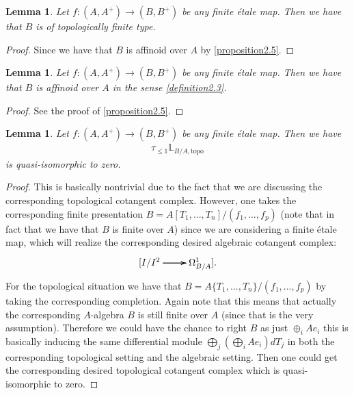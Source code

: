 \documentclass[12pt]{amsart}
\newtheorem{lemma}[theorem]{Lemma}
\theoremstyle{definition}
\numberwithin{equation}{section}
\begin{document}
\begin{lemma}
Let $f:(A,A^+)\rightarrow (B,B^+)$ be any finite \'etale map. Then we have that $B$ is of topologically finite type.
\end{lemma}

\begin{proof}
Since we have that $B$ is affinoid over $A$ by \cref{proposition2.5}.	
\end{proof}



\begin{lemma}
Let $f:(A,A^+)\rightarrow (B,B^+)$ be any finite \'etale map. Then we have that $B$ is affinoid over $A$ in the sense \cref{definition2.3}.
\end{lemma}

\begin{proof}
See the proof of \cref{proposition2.5}.	
\end{proof}




\begin{lemma}
Let $f:(A,A^+)\rightarrow (B,B^+)$ be any finite \'etale map. Then we have 
\begin{align}
\tau_{\leq 1}\mathbb{L}_{B/A,\mathrm{topo}}	
\end{align}
is quasi-isomorphic to zero.	
\end{lemma}


\begin{proof}
This is basically nontrivial due to the fact that we are discussing the corresponding topological cotangent complex. However, one takes the corresponding finite presentation $B=A[T_1,...,T_n]/(f_1,...,f_p)$ (note that in fact that we have that $B$ is finite over $A$) since we are considering a finite \'etale map, which will realize the corresponding desired algebraic cotangent complex:
\[
\xymatrix@C+0pc@R+0pc{
[I/I^2\ar[r] \ar[r] \ar[r] &\Omega^1_{B/A}].
}
\]
For the topological situation we have that $B=A\{T_1,...,T_n\}/(f_1,...,f_p)$ by taking the corresponding completion. Again note that this means that actually the corresponding $A$-algebra $B$ is still finite over $A$ (since that is the very assumption). Therefore we could have the chance to right $B$ as just $\oplus_{i} Ae_i$ this is basically inducing the same differential module $\bigoplus_j(\bigoplus_{i} Ae_i) dT_j$ in both the corresponding topological setting and the algebraic setting. Then one could get the corresponding desired topological cotangent complex which is quasi-isomorphic to zero.
\end{proof}
\end{document}
